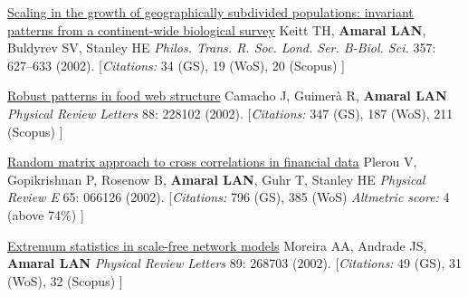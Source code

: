 \NumberedItem{\makebox[0.8cm][r]{[45]}}
\href{/people/amaral/scaling-in-the-growth-of-geographically-subdivided-populations-invariant-patterns-from-a-continent-wide-biological-survey}
{Scaling in the growth of geographically subdivided populations: invariant patterns from a continent-wide biological survey}
\newline
Keitt TH, {\textbf{Amaral LAN}}, Buldyrev SV, Stanley HE
\newline
\textit{Philos. Trans. R. Soc. Lond. Ser. B-Biol. Sci.}
    357:
627--633 (2002).
    \newline
    \hfill [{\em{Citations:}} 34 (GS),
    19 (WoS), 20 (Scopus)
    ]
\newline
\Gap
~
\Gap

\NumberedItem{\makebox[0.8cm][r]{[44]}}
\href{/people/amaral/robust-patterns-in-food-web-structure}
{Robust patterns in food web structure}
\newline
Camacho J, Guimer\`a R, {\textbf{Amaral LAN}}
\newline
\textit{Physical Review Letters}
    88:
228102 (2002).
    \newline
    \hfill [{\em{Citations:}} 347 (GS),
    187 (WoS), 211 (Scopus)
    ]
\newline
\Gap
~
\Gap

\NumberedItem{\makebox[0.8cm][r]{[43]}}
\href{/people/amaral/random-matrix-approach-to-cross-correlations-in-financial-data}
{Random matrix approach to cross correlations in financial data}
\newline
Plerou V, Gopikrishnan P, Rosenow B, {\textbf{Amaral LAN}}, Guhr T, Stanley HE
\newline
\textit{Physical Review E}
    65:
066126 (2002).
    \newline
    \hfill [{\em{Citations:}} 796 (GS),
    385 (WoS)
        {\hspace*{1cm} \em{Altmetric score:}}  4 (above 74\%)
    ]
\newline
\Gap
~
\Gap

\NumberedItem{\makebox[0.8cm][r]{[42]}}
\href{/people/amaral/extremum-statistics-in-scale-free-network-models}
{Extremum statistics in scale-free network models}
\newline
Moreira AA, Andrade JS, {\textbf{Amaral LAN}}
\newline
\textit{Physical Review Letters}
    89:
268703 (2002).
    \newline
    \hfill [{\em{Citations:}} 49 (GS),
    31 (WoS), 32 (Scopus)
    ]
\newline
\Gap
~
\Gap

